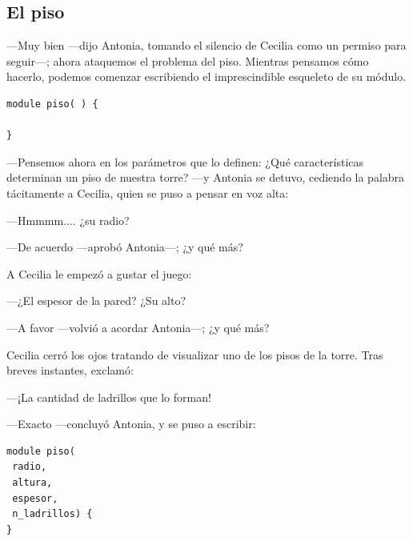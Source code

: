  \subsection{El piso}

  ---Muy bien ---dijo Antonia, tomando el silencio de Cecilia como un
  permiso para seguir---; ahora ataquemos el problema del
  piso. Mientras pensamos cómo hacerlo, podemos comenzar escribiendo
  el imprescindible esqueleto de su módulo.

  

\begin{lstlisting}
module piso( ) {

}
\end{lstlisting}

  ---Pensemos ahora en los parámetros que lo definen: ¿Qué
    características determinan un piso de nuestra torre? ---y
  Antonia se detuvo, cediendo la palabra tácitamente a Cecilia, quien
  se puso a pensar en voz alta:

  ---Hmmmm.... ¿su radio?

  ---De acuerdo ---aprobó Antonia---; ¿y qué más?

  A Cecilia le empezó a gustar el juego:

  ---¿El espesor de la pared? ¿Su alto?

  ---A favor ---volvió a acordar Antonia---; ¿y qué más?

  Cecilia cerró los ojos tratando de visualizar uno de los pisos de la
  torre. Tras breves instantes, exclamó:

  ---¡La cantidad de ladrillos que lo forman!

  ---Exacto ---concluyó Antonia, y se puso a escribir:


\begin{lstlisting}
module piso(
 radio,
 altura,
 espesor,
 n_ladrillos) {
}
\end{lstlisting}

